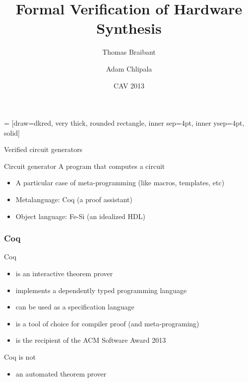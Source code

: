 \documentclass[9pt]{beamer}
\title{Formal Verification of Hardware Synthesis}%
\author{Thomas Braibant \and Adam Chlipala}
\institute[Inria, MIT]{Inria \and MIT CSAIL}
\date[07/2013]{CAV 2013}
\newcommand{\redemph}[1]{\alert{\emph{#1}}}
\begin{document}
\newcommand \orange[1]{{\color{orange}{#1}}}

\newcommand\parenthesis[1] {
  \begin{flushright}
    {\scriptsize \redemph{{{{ #1}}}}}
  \end{flushright}

}

 = [draw=dkred, very thick, rounded rectangle, inner
sep=4pt, inner ysep=4pt, solid]

\begin{frame}
  \center 
  \titlepage
\end{frame} 


\begin{frame}{Verified circuit generators}
  \begin{block}{Circuit generator}
    A program that computes a circuit
  \end{block}
  
  \begin{itemize}
  \item A particular case of meta-programming (like macros, templates,
    etc)
  \item Metalanguage: Coq (a proof assistant)
  \item Object language: Fe-Si (an idealized HDL)
  \end{itemize}
\end{frame}

\begin{frame}
  \frametitle{Coq}
  \begin{block}{Coq}
    \begin{itemize}
    \item is an interactive theorem prover
    \item implements a dependently typed programming language
    \item can be used as a specification language
    \item is a tool of choice for compiler proof (and meta-programing) 
    \item is the recipient of the ACM Software Award 2013
    \end{itemize}
  \end{block}
  \begin{block}{Coq is not}
    \begin{itemize}
    \item an automated theorem prover
    \end{itemize}
  \end{block}
\end{frame}
\end{document}
